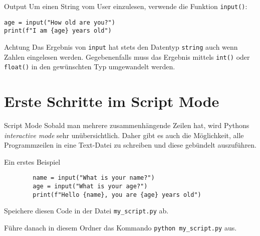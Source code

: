 \documentclass[algorithm,pgfplots,colortheme=dark]{cuzbeamer}
\newcommand{\py}[1]{\texttt{#1}}
\newcommand{\pybw}[1]{\texttt{#1}}
\begin{document}
\begin{fragile}
\begin{block}{Output}
	\vspace{2pt}
Um einen String vom User einzulesen, verwende die Funktion \py{input()}:
\begin{verbatim}
age = input("How old are you?")
print(f"I am {age} years old")
\end{verbatim}
\end{block}

\begin{alertblock}{Achtung}
	\vspace{2pt}
Das Ergebnis von \py{input} hat stets den Datentyp \py{string} auch wenn Zahlen eingelesen werden. Gegebenenfalls muss das Ergebnis mittels \py{int()} oder \py{float()} in den gewünschten Typ umgewandelt werden. 	
\end{alertblock}

\end{fragile}

\section{Erste Schritte im Script Mode}
\begin{frame}
\begin{block}{Script Mode}
	\vspace{2pt}
	Sobald man mehrere zusammenhängende Zeilen hat, wird Pythons \textit{interactive mode} sehr unübersichtlich. Daher gibt es auch die Möglichkeit, alle Programmzeilen in eine Text-Datei zu schreiben und diese gebündelt auszuführen.   
\end{block}

\end{frame}
\begin{fragile}[]
	\begin{exampleblock}{Ein erstes Beispiel}
		\begin{verbatim}
		name = input("What is your name?")
		age = input("What is your age?")
		print(f"Hello {name}, you are {age} years old") 
		\end{verbatim}
		
		Speichere diesen Code in der Datei \py{my_script.py} ab. 
		
		Führe danach in diesem Ordner das Kommando 
		\pybw{python my_script.py} aus. 
	\end{exampleblock}
\end{fragile}
\end{document}
